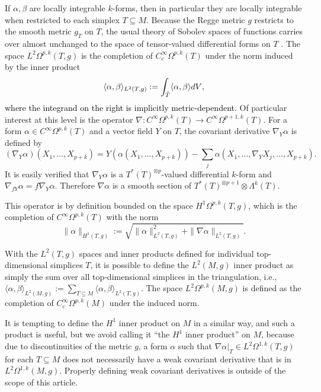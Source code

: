 \documentclass[11pt]{article}
\newcommand{\iprod}[1]{\langle #1 \rangle}
\newcommand{\correction}[2]{\textcolor{red}{}\textcolor{black}{#2}}
\begin{document}
If $\alpha,\beta$ are locally integrable $k$-forms, then in particular they are locally integrable when restricted to each simplex $T \subseteq M$. Because the Regge metric $g$ restricts to the smooth metric $g_T$ on $T$, the usual theory of Sobolev spaces of functions carries over almost unchanged to the space of tensor-valued differential forms on $T$ \cite[p. 30]{Schwarz}. The space $L^2\Omega^{p,k}(T,g)$ is the completion of $C^\infty_c \Omega^{p,k}(T)$ under the norm induced by the inner product
\[\iprod{\alpha,\beta}_{L^2(T,g)} := \int_{\mathring{T}} \iprod{\alpha,\beta}dV\correction{.}{,}\]
\correction{}{where the integrand on the right is implicitly metric-dependent.}
Of particular interest at this level is the operator $\nabla: C^\infty\Omega^{p,k}(T) \to C^\infty\Omega^{p+1,k}(T)$. For a form $\alpha \in C^\infty\Omega^{p,k}(T)$ and a vector field $Y$ on $T$, the covariant derivative $\nabla_Y \alpha$ is defined by
\[
(\nabla_Y \alpha)(X_1,\dots,X_{p+k}) = Y(\alpha(X_1,\dots,X_{p+k})) - \sum_j \alpha(X_1,\dots,\nabla_YX_j,\dots,X_{p+k}).
\]
It is easily verified that $\nabla_Y \alpha$ is a $T^*(T)^{\otimes p}$-valued differential $k$-form and $\nabla_{fY}\alpha = f\nabla_Y \alpha$. Therefore $\nabla \alpha$ is a smooth section of $T^*(T)^{\otimes p+1} \otimes \Lambda^k(T)$. 

This operator is by definition bounded on the space $H^1\Omega^{p,k}(T,g)$, which is the completion of $C^\infty\Omega^{p,k}(T)$ with the norm 
\[\|\alpha\|_{H^1(T,g)} := \sqrt{\|\alpha\|_{L^2(T,g)}^2 + \|\nabla \alpha\|_{L^2(T,g)}}.\]

With the $L^2(T,g)$ spaces and inner products defined for individual top-dimensional simplices $T$, it is possible to define the $L^2(M,g)$ inner product as simply the sum over all top-dimensional simplices in the triangulation, i.e., $\iprod{\alpha,\beta}_{L^2(M,g)} := \sum_{T \subseteq M} \iprod{\alpha,\beta}_{L^2(T,g)}$. The space $L^2\Omega^{p,k}(M,g)$ is defined as the completion of $C^\infty_c\Omega^{p,k}(M)$ under the induced norm.

It is tempting to define the $H^1$ inner product on $M$ in a similar way, and such a product is useful, but we avoid calling it ``the $H^1$ inner product'' on $M$, because due to discontinuities of the metric $g$, a form $\alpha$ such that $\nabla\alpha|_T \in L^2\Omega^{1,k}(T,g)$ for each $T \subseteq M$ does not necessarily have a weak covariant derivative that is in $L^2\Omega^{1,k}(M,g)$. Properly defining weak covariant derivatives is outside of the scope of this article.
\end{document}
